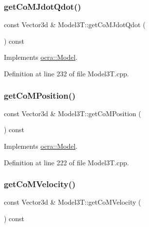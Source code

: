 \hypertarget{classModel3T_a408213f442ab7287c44e86e6d72f825c}{}\label{classModel3T_a408213f442ab7287c44e86e6d72f825c} 
\subsubsection{\texorpdfstring{get\+Co\+M\+Jdot\+Qdot()}{getCoMJdotQdot()}}
{\footnotesize\ttfamily const Vector3d \& Model3\+T\+::get\+Co\+M\+Jdot\+Qdot (\begin{DoxyParamCaption}{ }\end{DoxyParamCaption}) const\hspace{0.3cm}{\ttfamily [virtual]}}



Implements \hyperlink{classocra_1_1Model_a2be9c0fdd8dbe4ecbb99eef5f4ea45d1}{ocra\+::\+Model}.



Definition at line 232 of file Model3\+T.\+cpp.

\hypertarget{classModel3T_ad81ca6213b967fb62d8c1682c3389736}{}\label{classModel3T_ad81ca6213b967fb62d8c1682c3389736} 
\subsubsection{\texorpdfstring{get\+Co\+M\+Position()}{getCoMPosition()}}
{\footnotesize\ttfamily const Vector3d \& Model3\+T\+::get\+Co\+M\+Position (\begin{DoxyParamCaption}{ }\end{DoxyParamCaption}) const\hspace{0.3cm}{\ttfamily [virtual]}}



Implements \hyperlink{classocra_1_1Model_a9c3b077772e4886299f613a71f8981e2}{ocra\+::\+Model}.



Definition at line 222 of file Model3\+T.\+cpp.

\hypertarget{classModel3T_abe65ef07b4e6c61f6567c1f007631081}{}\label{classModel3T_abe65ef07b4e6c61f6567c1f007631081} 
\subsubsection{\texorpdfstring{get\+Co\+M\+Velocity()}{getCoMVelocity()}}
{\footnotesize\ttfamily const Vector3d \& Model3\+T\+::get\+Co\+M\+Velocity (\begin{DoxyParamCaption}{ }\end{DoxyParamCaption}) const\hspace{0.3cm}{\ttfamily [virtual]}}



